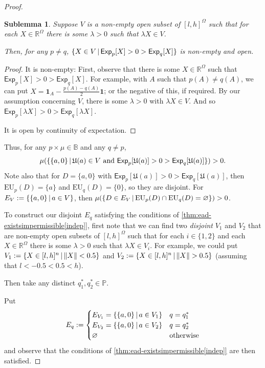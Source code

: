 \documentclass[a4paper,final]{article}
\newtheorem{sublemma}{Sublemma}[theorem]
\renewcommand\P{\mathbb{P}} %
\newcommand\Exp{\mathsf{Exp}}
\newcommand\EU{\mathrm{EU}}
\newcommand\U{\mathfrak{U}} %
\newcommand{\IB}{\mathbb{B}}
\newcommand{\IP}{\P}
\renewcommand{\Re}{\mathbb{R}}
\newcommand\SetDelimiter[1][]{
	\nonscript\,#1\vert \allowbreak \nonscript\,\mathopen{}}
\providecommand\given{\SetDelimiter}
\renewcommand{\emptyset}{\varnothing}
\newenvironment{CCM rewritten}
{\begingroup\color{blue}} %
{\endgroup}              %
\begin{document}
\begin{proof}





\begin{sublemma}
	Suppose $V$ is a non-empty open subset of $[l,h]^\Omega$ such that for each $X\in \Re^\Omega$ there is some $\lambda>0$ such that $\lambda X\in V$. 
	
	Then, for any $p\neq q$, $\{X\in V\given \Exp_p[X]>0>\Exp_q[X]\}$ is non-empty and open.
\end{sublemma}
\begin{proof}
	{It is non-empty}:
	First, observe that there is some $X\in\Re^\Omega$ such that $\Exp_p[X]>0>\Exp_q[X]$. For example, with $A$ such that $p(A)\neq q(A)$, we can put $X=\mathbf{1}_A-\frac{p(A)-q(A)}{2}\mathbf{1}$; or the negative of this, if required. %
	By our assumption concerning $V$, there is some $\lambda >0$ with $\lambda X\in V$. And so $\Exp_p[\lambda X]>0>\Exp_{q}[\lambda X]$. 
	
	It is open by continuity of expectation. 
\end{proof}

Thus, for any $p\times\mu\in\IB$ and any $q\neq p$, $$\mu(\{\{a,0\}\given \U(a)\in V\text{ and }\Exp_p[\U(a)]>0>\Exp_q[\U(a)] \})>0.$$ Note also that for $D=\{a,0\}$ with $\Exp_p[\U(a)]>0>\Exp_q[\U(a)]$, then $\EU_{p}(D)=\{a\}$ and $\EU_q(D)=\{0\}$, so they are disjoint. 
For $E_V:=\{\{a,0\}\given a\in V\}$, then $\mu(\{D\in E_V\given \EU_p(D)\cap\EU_q(D)=\emptyset\})>0$. 

To construct our disjoint $E_q$ satisfying the conditions of \cref{thm:ead-existsimpermissible[indep]}, first note that we can find two \emph{disjoint} $V_1$ and $V_2$ that are  non-empty open subsets of $[l,h]^\Omega$ such that for each $i\in\{1,2\}$ and each $X\in \Re^\Omega$ there is some $\lambda>0$ such that $\lambda X\in V_i$.
For example, we could put  $V_1:=\{X\in[l,h]^n\given \|X\|<0.5\}$ and $V_2:=\{X\in[l,h]^n\given \|X\|>0.5\}$ (assuming that $l<-0.5<0.5<h$). 


Then take any distinct $q^*_1,q^*_2\in\IP$. 

Put $$E_q:=\begin{cases}
	E_{V_1}=\{\{a,0\}\given a\in V_1\}&q=q^*_1\\
	E_{V_2}=\{\{a,0\}\given a\in V_2\}&q=q^*_2\\
	\emptyset&\text{otherwise}
\end{cases}$$
and observe that the conditions of \cref{thm:ead-existsimpermissible[indep]} are then satisfied. 
\end{proof}
\end{document}

